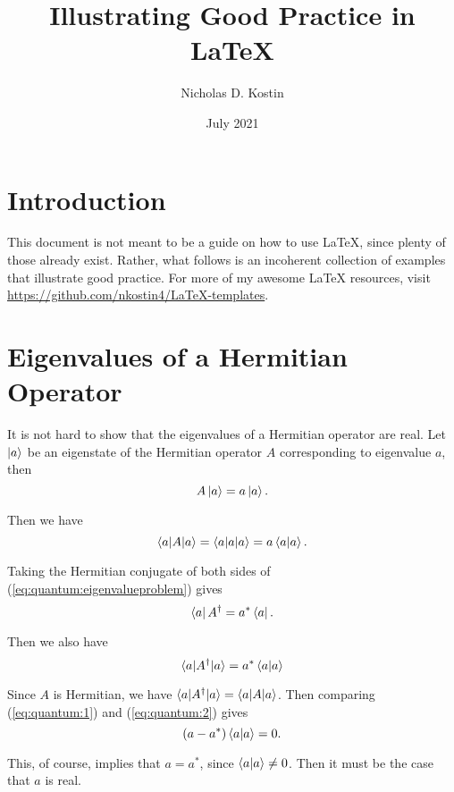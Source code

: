 \documentclass{article}
\title{Illustrating Good Practice in {\LaTeX}}
\author{Nicholas D. Kostin}
\date{July 2021}
\begin{document}
\maketitle

\section{Introduction}

This document is not meant to be a guide on how to use {\LaTeX}, since plenty of those already exist. Rather, what follows is an incoherent collection of examples that illustrate good practice. For more of my awesome {\LaTeX} resources, visit \url{https://github.com/nkostin4/LaTeX-templates}.

\section{Eigenvalues of a Hermitian Operator}

It is not hard to show that the eigenvalues of a Hermitian operator are real. Let $\ket{a}$ be an eigenstate of the Hermitian operator $A$ corresponding to eigenvalue $a$, then
\begin{equation}
    A \ket{a} = a \ket{a}. \label{eq:quantum:eigenvalueproblem}
\end{equation}

Then we have
\begin{equation}
    \braket{a|A|a} = \braket{a|a|a} = a\braket{a|a}. \label{eq:quantum:1}
\end{equation}

Taking the Hermitian conjugate of both sides of (\ref{eq:quantum:eigenvalueproblem}) gives
\begin{equation}
    \bra{a} A^{\dagger} = a^{*} \bra{a}.
\end{equation}

Then we also have
\begin{equation}
    \braket{a|A^{\dagger}|a} = a^{*} \braket{a|a} \label{eq:quantum:2}
\end{equation}

Since $A$ is Hermitian, we have $\braket{a|A^{\dagger}|a} = \braket{a|A|a}$. Then comparing (\ref{eq:quantum:1}) and (\ref{eq:quantum:2}) gives
\begin{equation*}
    \left( a - a^* \right) \braket{a|a} = 0.
\end{equation*}

This, of course, implies that $a = a^*$, since $\braket{a|a} \neq 0$. Then it must be the case that $a$ is real.
\end{document}
